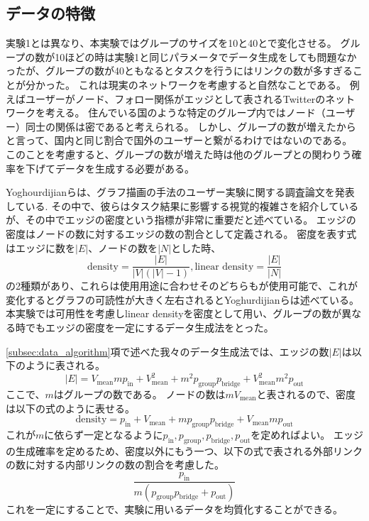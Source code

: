\documentclass{kuee}
\begin{document}
\subsection{データの特徴}
\label{subsec:data_feature}
実験1とは異なり、本実験ではグループのサイズを10と40とで変化させる。
グループの数が10ほどの時は実験1と同じパラメータでデータ生成をしても問題なかったが、グループの数が40ともなるとタスクを行うにはリンクの数が多すぎることが分かった。
これは現実のネットワークを考慮すると自然なことである。
例えばユーザーがノード、フォロー関係がエッジとして表されるTwitterのネットワークを考える。
住んでいる国のような特定のグループ内ではノード（ユーザー）同士の関係は密であると考えられる。
しかし、グループの数が増えたからと言って、国内と同じ割合で国外のユーザーと繋がるわけではないのである。
このことを考慮すると、グループの数が増えた時は他のグループとの関わりう確率を下げてデータを生成する必要がある。

Yoghourdijianらは、グラフ描画の手法のユーザー実験に関する調査論文を発表している\cite{yoghourdjian2018exploring}.
その中で、彼らはタスク結果に影響する視覚的複雑さを紹介しているが、その中でエッジの密度という指標が非常に重要だと述べている。
エッジの密度はノードの数に対するエッジの数の割合として定義される。
密度を表す式はエッジに数を$|E|$、ノードの数を$|N|$とした時、
\[
  \text{density} = \frac{|E|}{|V|(|V| - 1)},  \text{linear density} = \frac{|E|}{|N|}
 \]
の2種類があり、これらは使用用途に合わせそのどちらもが使用可能で、これが変化するとグラフの可読性が大きく左右されるとYoghurdijianらは述べている。
本実験では可用性を考慮しlinear densityを密度として用い、グループの数が異なる時でもエッジの密度を一定にするデータ生成法をとった。

\ref{subsec:data_algorithm}項で述べた我々のデータ生成法では、エッジの数$|E|$は以下のように表される。
\[
  |E| = V_{\text{mean}} m p_{\text{in}} + V_{\text{mean}}^2 + m^2 p_{\text{group}} p_{\text{bridge}} + V_{\text{mean}}^2 m^2 p_{\text{out}}
\]
ここで、$m$はグループの数である。
ノードの数は$m V_{\text{mean}}$と表されるので、密度は以下の式のように表せる。
\[
  \text{density} = p_{\text{in}} + V_{\text{mean}} + m p_{\text{group}} p_{\text{bridge}} + V_{\text{mean}} m p_{\text{out}}
\]
これが$m$に依らず一定となるように$p_{\text{in}}, p_{\text{group}}, p_{\text{bridge}}, p_{\text{out}}$を定めればよい。
エッジの生成確率を定めるため、密度以外にもう一つ、以下の式で表される外部リンクの数に対する内部リンクの数の割合を考慮した。
\[
  \frac{p_{\text{in}}}{m (p_{\text{group}} p_{\text{bridge}} + p_{\text{out}})}
\]
これを一定にすることで、実験に用いるデータを均質化することができる。
\end{document}
